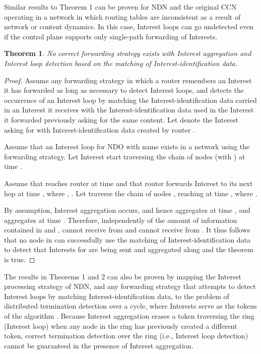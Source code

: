 \documentclass{ancs15-alternate}
\newtheorem{theorem}{Theorem}
\begin{document}
Similar results to Theorem 1 can be proven for NDN and the original CCN  operating in a network  in which routing tables are inconsistent as a result of network or content dynamics.   In this case, Interest loops can go undetected even if the control plane supports only single-path forwarding of Interests. 

\begin{theorem}
\label{theo2}
No correct forwarding strategy exists with Interest aggregation and  Interest loop detection based on the matching of Interest-identification data.
\end{theorem}

\begin{proof}
Assume any  forwarding strategy in which a router remembers an Interest it has forwarded as long as necessary to detect Interest loops, and detects the occurrence of an Interest loop by matching the Interest-identification data carried in an Interest it receives with the Interest-identification data used in the Interest it forwarded previously asking for the same content. Let 
 denote the Interest asking for  with Interest-identification data   created by router .

Assume that an Interest  loop     for NDO with name  exists in a network using the  forwarding strategy.
Let Interest  start traversing the chain of nodes  
     (with ) at time .

Assume that  reaches router  at time  and that router  forwards Interest  to its next hop   at time , where ,  .
Let  traverse the chain of nodes    , reaching  at time , where 
.

By assumption, Interest aggregation occurs, and hence  aggregates  at time , and  aggregates  at time .
Therefore, independently of the amount of information contained in  and ,   cannot receive  from  and 
 cannot receive   from .
It thus follows that no node in  can successfully 
use the matching of Interest-identification data to detect that 
Interests for  are being sent and aggregated along  and the theorem is true.
\end{proof}

The results in Theorems 1 and 2
can also be proven by mapping the Interest processing strategy of NDN, and any forwarding strategy that attempts to detect Interest loops 
by matching Interest-identification data,  to the problem of distributed termination detection over a cycle, where Interests serve as the tokens of the algorithm \cite{dijkstra, dtd}.
Because Interest aggregation erases a token traversing the ring (Interest loop) when any node in the ring has previously created a different token,  correct termination detection over the ring (i.e., Interest loop detection) cannot be guaranteed in the presence of Interest aggregation.
\end{document}
